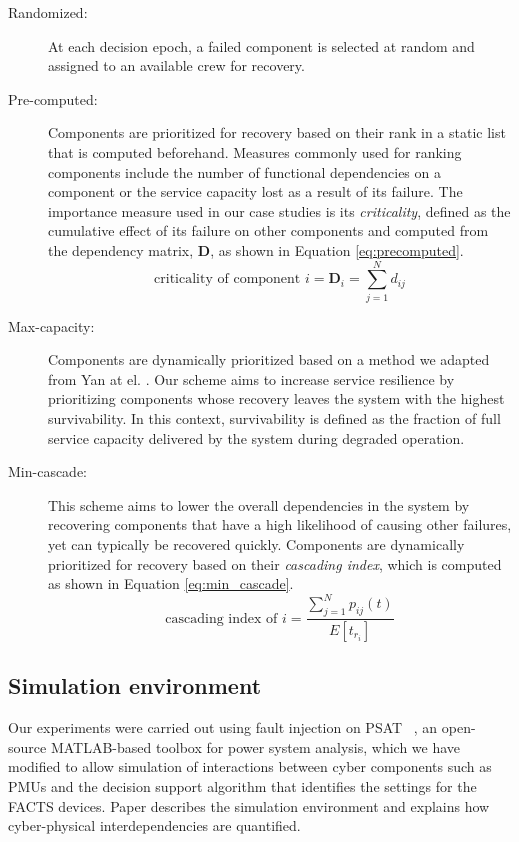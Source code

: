 \documentclass[conference]{IEEEtran}
\begin{document}
\begin{description}
    \item[Randomized:] At each decision epoch, a failed component is selected at random and assigned to an available crew for recovery. 
    
    \item[Pre-computed:] Components are prioritized for recovery based on their rank in a static list that is computed beforehand. Measures commonly used for ranking components include the number of functional dependencies on a component or the service capacity lost as a result of its failure. The importance measure used in our case studies is its \emph{criticality}, defined as the cumulative effect of its failure on other components \cite{woodard_survivability_2021} and computed from the dependency matrix, $\mathbf{D}$, as shown in Equation \ref{eq:precomputed}.
    \begin{equation}
        \text{criticality of component } i = \mathbf{D}_i = \sum_{j=1}^{N} d_{ij}
        \label{eq:precomputed}
    \end{equation}
    
    \item[Max-capacity:] Components are dynamically prioritized based on a method we adapted from Yan at el. \cite{yan_dynamic_2021}. Our scheme aims to increase service resilience by prioritizing components whose recovery leaves the system with the highest survivability. In this context, survivability is defined as the fraction of full service capacity delivered by the system during degraded operation. 
    
    \item[Min-cascade:] This scheme aims to lower the overall dependencies in the system by recovering components that have a high likelihood of causing other failures, yet can typically be recovered quickly. Components are dynamically prioritized for recovery based on their \emph{cascading index}, which is computed as shown in Equation \ref{eq:min_cascade}.
    \begin{equation}
    \label{eq:min_cascade}
    \text{cascading index of } i 
    = \frac{\sum_{j=1}^{N} p_{ij} (t)}{E[t_{r_i}]}
    \end{equation}
\end{description}



\subsection{Simulation environment}
Our experiments were carried out using fault injection on PSAT ~\cite{psat_2005}, an open-source MATLAB-based toolbox for power system analysis, which we have modified to allow simulation of interactions between cyber components such as PMUs and the decision support algorithm that identifies the settings for the FACTS devices. Paper \cite{MaS17c, marashi_identification_2021}  describes the simulation environment and explains how cyber-physical interdependencies are quantified. 
\end{document}
